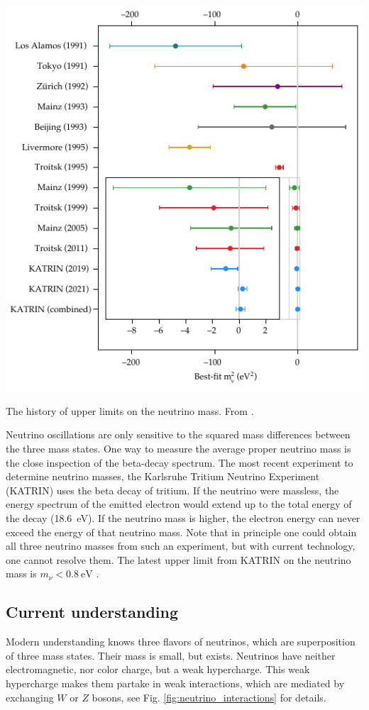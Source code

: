 \documentclass[
    a4paper, %
    fontsize=10pt, %
    twoside=false, %
    numbers=noenddot, %
    fontmethod=tex,
]{kaobook}
\begin{document}
\begin{marginfigure}
    \includegraphics{theory/mass_history.pdf}
    \caption[Neutrino mass upper limit history]{The history of upper limits on the neutrino mass. From \cite{Aker2022}.}
\end{marginfigure}

Neutrino oscillations are only sensitive to the squared mass differences between the three mass states. One way to measure the average proper neutrino mass is the close inspection of the beta-decay spectrum. The most recent experiment to determine neutrino masses, the Karlsruhe Tritium Neutrino Experiment (KATRIN) uses the beta decay of tritium. If the neutrino were massless, the energy spectrum of the emitted electron would extend up to the total energy of the decay (\SI{18.6}{\eV}). If the neutrino mass is higher, the electron energy can never exceed the energy of that neutrino mass. Note that in principle one could obtain all three neutrino masses from such an experiment, but with current technology, one cannot resolve them. The latest upper limit from KATRIN on the neutrino mass is $m_\nu < \SI{0.8}{\eV}$ .


\subsection{Current understanding}
Modern understanding knows three flavors of neutrinos, which are superposition of three mass states. Their mass is small, but exists. Neutrinos have neither electromagnetic, nor color charge, but a weak hypercharge. This weak hypercharge makes them partake in weak interactions, which are mediated by exchanging $W$ or $Z$ bosons, see Fig. \ref{fig:neutrino_interactions} for details.
\end{document}
